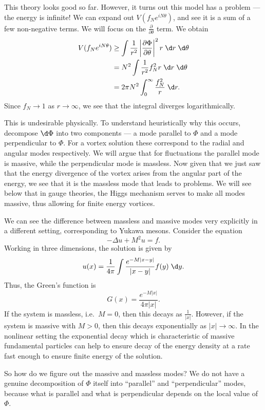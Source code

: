 \documentclass[a4paper]{article}
\begin{document}
This theory looks good so far. However, it turns out this model has a problem --- the energy is infinite! We can expand out $V(f_N e^{iN \theta})$, and see it is a sum of a few non-negative terms. We will focus on the $\frac{\partial}{\partial \theta}$ term. We obtain
\begin{align*}
  V(f_N e^{iN\theta}) &\geq \int \frac{1}{r^2} \left|\frac{\partial \Phi}{\partial \theta}\right|^2 r\;\d r\;\d \theta\\
  &= N^2 \int \frac{1}{r^2} f_N^2 r\;\d r\;\d \theta \\
  &= 2\pi N^2 \int_0^\infty \frac{f_N^2}{r}\;\d r.
\end{align*}
Since $f_N \to 1$ as $r \to \infty$, we see that the integral diverges logarithmically.

This is undesirable physically. To understand heuristically why this occurs, decompose $\d \Phi$ into two components --- a mode parallel to $\Phi$ and a mode perpendicular to $\Phi$. For a vortex solution these correspond to the radial and angular modes respectively. We will argue that for fluctuations the parallel mode is massive, while the perpendicular mode is massless. Now given that we just saw that the energy divergence of the vortex arises from the angular part of the energy, we see that it is the massless mode that leads to problems. We will see below that in gauge theories, the Higgs mechanism serves to make all modes massive, thus allowing for finite energy vortices.

We can see the difference between massless and massive modes very explicitly in a different setting, corresponding to Yukawa mesons. Consider the equation
\[
  -\Delta u + M^2 u = f.
\]
Working in three dimensions, the solution is given by
\[
  u(x) = \frac{1}{4\pi} \int \frac{e^{-M|x - y|}}{|x - y|} f(y)\;\d y.
\]
Thus, the Green's function is
\[
  G(x) = \frac{e^{-M|x|}}{4\pi|x|}.
\]
If the system is massless, i.e.\ $M = 0$, then this decays as $\frac{1}{|x|}$. However, if the system is massive with $M > 0$, then this decays exponentially as $|x| \to \infty$. In the nonlinear setting the exponential decay which is characteristic of massive fundamental particles can help to ensure decay of the energy density at a rate fast enough to ensure finite energy of the solution.

So how do we figure out the massive and massless modes? We do not have a genuine decomposition of $\Phi$ itself into ``parallel'' and ``perpendicular'' modes, because what is parallel and what is perpendicular depends on the local value of $\Phi$.
\end{document}
